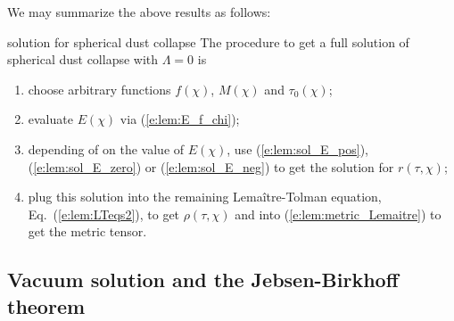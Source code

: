 We may summarize the above results as follows:
\begin{tprop}{solution for spherical dust collapse}{}
The procedure to get a full solution of spherical dust collapse with $\Lambda=0$ is
\begin{enumerate}
\item choose arbitrary functions
$f(\chi)$, $M(\chi)$ and $\tau_0(\chi)$;
\item evaluate $E(\chi)$ via (\ref{e:lem:E_f_chi});
\item depending of
on the value of $E(\chi)$, use (\ref{e:lem:sol_E_pos}), (\ref{e:lem:sol_E_zero})
or (\ref{e:lem:sol_E_neg}) to get the solution for $r(\tau,\chi)$;
\item plug this solution into the remaining Lemaître-Tolman equation,
Eq.~(\ref{e:lem:LTeqs2}), to get $\rho(\tau,\chi)$ and into
(\ref{e:lem:metric_Lemaitre}) to get the metric tensor.
\end{enumerate}
\end{tprop}

\subsection{Vacuum solution and the Jebsen-Birkhoff theorem} \label{s:lem:Birkhoff}

